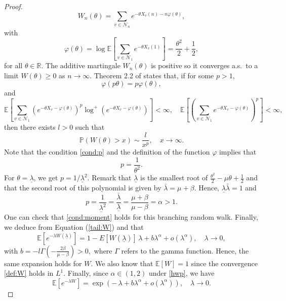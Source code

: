 \documentclass[11pt]{article}
\theoremstyle{plain}
\begin{document}
\begin{proof}
\begin{equation*}
    W_n(\theta)=\sum_{v\in\mathcal{N}_n}e^{-\theta X_v(n)-n\varphi(\theta)},
\end{equation*} 
with $$\varphi(\theta)=\log\mathbb{E}\left[\sum_{v\in \mathcal{N}_1}e^{-\theta X_v(1)}\right]=\frac{\theta^2}{2}+\frac{1}{2},$$  for all $\theta\in \mathbb{R}$. The additive martingale $W_n(\theta)$ is positive so it converges a.s.~to a limit $W(\theta)\geq0$ as $n\to\infty$.
Theorem 2.2 of \cite{Liu:2000aa} states that, if for some $p>1$,
\begin{equation}
\varphi(p\theta)=p\varphi(\theta) \label{cond:p},
\end{equation}
and
\begin{equation}
\mathbb{E}\left[\sum_{v\in \mathcal{N}_1}\left(e^{-\theta X_v-\varphi(\theta)}\right)^p\log^+\left(e^{-\theta X_v-\varphi(\theta)}\right)\right]<\infty,\quad  \mathbb{E}\left[\left(\sum_{v\in \mathcal{N}_1} e^{-\theta X_v-\varphi(\theta)}\right)^p\right]<\infty, \label{cond:moment}
\end{equation}
then there exists $l>0$ such that 
\begin{equation}
\mathbb{P}\left(W(\theta)>x\right)\sim \frac{l}{x^p}, \quad x\to\infty. \label{tail:W}
\end{equation}
Note that the condition \eqref{cond:p} and the definition of the function $\varphi$ implies that 
\begin{equation*}
p=\frac{1}{\theta^2}.
\end{equation*}
For $\theta= \underline{\lambda}$, we get $p=1/\underline{\lambda}^2$. Remark that $\underline{\lambda}$ is the smallest root of $\frac{\theta^2}{2}-\mu \theta +\frac{1}{2}$ and that the second root of this polynomial is given by $\bar{\lambda}=\mu+\beta$. Hence,  $\underline{\lambda}\bar{\lambda}=1$ and $$p=\frac{1}{\underline \lambda ^2}=\frac{\bar{\lambda}}{\underline{\lambda}}=\frac{\mu+\beta}{\mu-\beta}=\alpha>1.$$ 
One can check that \eqref{cond:moment} holds for this branching random walk.
Finally, we deduce from Equation (\ref{tail:W}) and \cite[Theorem 8.1.6]{Bingham:1989aa} that 
\begin{equation*}
\mathbb{E}\left[e^{-\lambda W(\underline{\lambda})}\right]=1-E[W(\underline{\lambda})]\, \lambda+b\lambda^\alpha+o(\lambda^\alpha),\quad\lambda\to 0,
\end{equation*}
with $b=-l\Gamma\left(-\frac{2\beta}{\mu-\beta}\right)>0,$ where $\Gamma$ refers to the gamma function.  Hence, the same expansion holds for $W$. We also know that $\mathbb{E}[W]=1$  since the convergence \eqref{def:W} holds in $L^1$. Finally, since  $\alpha \in(1,2)$ under \eqref{hwp}, we have
\begin{equation*}
\mathbb{E}\left[e^{-\lambda W}\right]=\exp\left(-\,\lambda+b\lambda^\alpha+o(\lambda^\alpha)\right), \quad \lambda\to0.
\end{equation*}
\end{proof}
\end{document}
